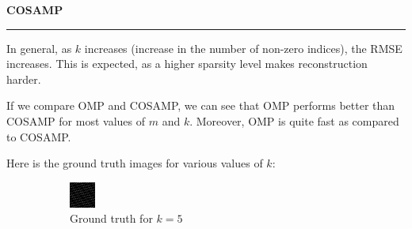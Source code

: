 \documentclass[a4paper,12pt]{article}
\newenvironment{solution}[2][]{%
    \begin{mdframed}[linecolor=blue!70!black, linewidth=2pt, roundcorner=10pt, backgroundcolor=yellow!10!white, skipabove=12pt, skipbelow=12pt]%
        \textbf{\large #2}
        \par\noindent\rule{\textwidth}{0.4pt}
}{
    \end{mdframed}
}
\begin{document}
\begin{solution}{COSAMP}
    
    In general, as $k$ increases (increase in the number of non-zero indices), the RMSE increases. This is expected, as a higher sparsity level makes reconstruction harder.

    If we compare OMP and COSAMP, we can see that OMP performs better than COSAMP for most values of $m$ and $k$. Moreover, OMP is quite fast as compared to COSAMP.
    
    Here is the ground truth images for various values of $k$:
    
    \begin{figure}[H]
      \centering
      \begin{subfigure}[t]{0.32\textwidth}
          \centering
          \includegraphics[width=\textwidth]{../images/cosamp/Ground_Truth_k_5.png}
          \caption{Ground truth for $k = 5$}
      \end{subfigure}
      \begin{subfigure}[t]{0.32\textwidth}
          \centering

\end{subfigure}
\end{figure}
\end{solution}
\end{document}

